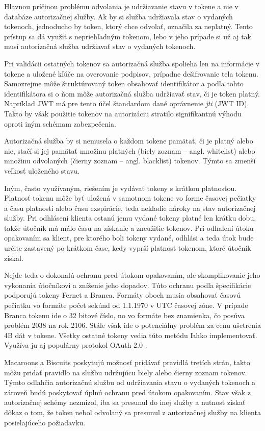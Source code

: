 Hlavnou príčinou problému odvolania je udržiavanie stavu v tokene a nie v databáze autorizačnej služby. Ak by si služba udržiavala stav o vydaných tokenoch, jednoducho by token, ktorý chce odvolať, označila za neplatný. Tento prístup sa dá využiť s nepriehľadným tokenom, lebo v jeho prípade si už aj tak musí autorizačná služba udržiavať stav o vydaných tokenoch.

Pri validácii ostatných tokenov sa autorizačná služba spolieha len na informácie v tokene a uložené kľúče na overovanie podpisov, prípadne dešifrovanie tela tokenu. Samozrejme môže štruktúrovaný token obsahovať identifikátor a podľa tohto identifikátora si o ňom môže autorizačná služba udržiavať stav, či je token platný. Napríklad JWT má pre tento účel štandardom dané oprávnenie \textit{jti} (JWT ID). Takto by však použitie tokenov na autorizáciu stratilo signifikantnú výhodu oproti iným schémam zabezpečenia.

Autorizačná služba by si nemusela o každom tokene pamätať, či je platný alebo nie, stačí si jej pamätať množinu platných (biely zoznam -- angl. whitelist) alebo množinu odvolaných (čierny zoznam -- angl. blacklist) tokenov. Týmto sa zmenší veľkosť uloženého stavu.

Iným, často využívaným, riešením je vydávať tokeny s krátkou platnosťou. Platnosť tokenu môže byť uložená v samotnom tokene vo forme časovej pečiatky a času platnosti alebo času exspirácie, teda nekladie nároky na stav autorizačnej služby. Pri odhlásení klienta ostanú jemu vydané tokeny platné len krátku dobu, takže útočník má málo času na získanie a zneužitie tokenov. Pri odhalení útoku opakovaním sa klient, pre ktorého boli tokeny vydané, odhlási a teda útok bude určite zastavený po krátkom čase, kedy vyprší platnosť tokenom, ktoré útočník získal.

Nejde teda o dokonalú ochranu pred útokom opakovaním, ale skomplikovanie jeho vykonania útočníkovi a zníženie jeho dopadov. Túto ochranu podľa špecifikácie podporujú tokeny Fernet a Branca. Formáty oboch musia obsahovať časovú pečiatku vo formáte počet sekúnd od 1.1.1970 v UTC časovej zóne. V prípade Branca tokenu ide o 32 bitové číslo, no vo formáte bez znamienka, čo posúva problém 2038 \cite{epoch_end} na rok 2106. Stále však ide o potenciálny problém za cenu ušetrenia 4B dát v tokene. Všetky ostatné tokeny vedia túto metódu ľahko implementovať. Využíva ju aj populárny protokol OAuth 2.0 \cite{oauth2}.

Macaroons a Biscuits poskytujú možnosť pridávať pravidlá tretích strán, takto môžu pridať pravidlo na službu udržujúcu biely alebo čierny zoznam tokenov. Týmto odľahčia autorizačnú službu od udržiavania stavu o vydaných tokenoch a zároveň budú poskytovať úplnú ochranu pred útokom opakovaním. Stav však z autorizačnej schémy nezmizol, iba sa presunul do inej služby a nutnosť získať dôkaz o tom, že token nebol odvolaný sa presunul z autorizačnej služby na klienta posielajúceho požiadavku.


